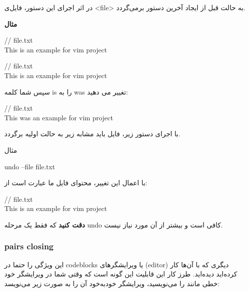 \documentclass[]{article}
\begin{document}
در اثر اجرای این دستور، فایل‌ی <file> به حالت قبل از ایجاد آخرین دستور برمی‌گردد.

\textbf{مثال}\\

\begin{latin}
{\mymono
// file.txt\\
This is an example for vim project\\}
\end{latin}

\begin{latin}
{\mymono
// file.txt\\
This is an example for vim project\\}
\end{latin}

سپس شما کلمه is را به was تغییر می دهید:

\begin{latin}
{\mymono
// file.txt\\
This was an example for vim project\\}
\end{latin}

با اجرای دستور زیر، فایل باید مشابه زیر به حالت اولیه برگردد.

\begin{mybox}[colback=yellow]{مثال}
	\begin{latin}	
		undo --file file.txt
	\end{latin}
\end{mybox}

با اعمال این تغییر، محتوای فایل ما عبارت است از:
\begin{latin}
{\mymono
// file.txt\\
This is an example for vim project\\}
\end{latin}


\textbf{دقت کنید} که فقط یک مرحله undo کافی است و بیشتر از آن مورد نیاز نیست.




\subsubsection*{{\titr pairs closing}}

این ویژگی را حتما در codeblocks یا ویرایشگرهای (editor) دیگری که با آن‌ها کار کرده‌اید دیده‌اید. طرز کار این قابلیت این گونه است که وقتی شما در ویرایشگر خود خطی مانند  را می‌نویسید، ویرایشگر خودبه‌خود آن را به صورت زیر می‌نویسد:\\
\end{document}
